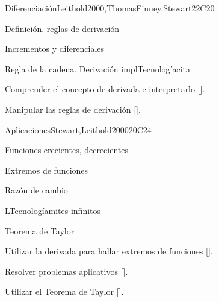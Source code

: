 \begin{syllabus}
\begin{unit}{}{Diferenciación}{Leithold2000,ThomasFinney,Stewart}{22}{C20}
   \begin{topics}
      \item Definición. reglas de derivación
      \item Incrementos y diferenciales
      \item Regla de la cadena. Derivación implTecnologíacita
   \end{topics}

   \begin{learningoutcomes}
      \item Comprender el concepto de derivada e interpretarlo [\Assessment].
      \item Manipular las reglas de derivación [\Assessment].
      \end{learningoutcomes}
\end{unit}

\begin{unit}{}{Aplicaciones}{Stewart,Leithold2000}{20}{C24}
   \begin{topics}
      \item Funciones crecientes, decrecientes
      \item Extremos de funciones
      \item Razón de cambio
      \item LTecnologíamites infinitos
      \item Teorema de Taylor
   \end{topics}

   \begin{learningoutcomes}
      \item Utilizar la derivada para hallar extremos de funciones [\Assessment].
      \item Resolver problemas aplicativos [\Assessment].
      \item Utilizar el Teorema de Taylor [\Assessment].
   \end{learningoutcomes}
\end{unit}



\begin{coursebibliography}
\end{coursebibliography}

\end{syllabus}

%

